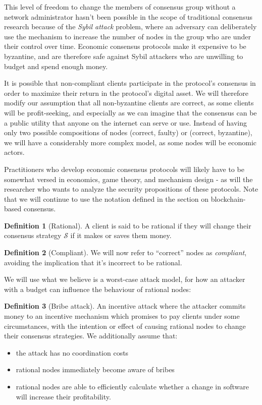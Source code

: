 \documentclass[11pt,a4paper]{article}
\theoremstyle{plain}
\theoremstyle{definition}
\newtheorem{defn}{Definition}
\begin{document}
This level of freedom to change the members of consensus group without a network administrator hasn't been possible in the scope of traditional consensus research because of the \emph{Sybil attack} problem, where an adversary can deliberately use the mechanism to increase the number of nodes in the group who are under their control over time. Economic consensus protocols make it expensive to be byzantine, and are therefore safe against Sybil attackers who are unwilling to budget and spend enough money. 

It is possible that non-compliant clients participate in the protocol's consensus in order to maximize their return in the protocol's digital asset. We will therefore modify our assumption that all non-byzantine clients are correct, as some clients will be profit-seeking, and especially as we can imagine that the consensus can be a public utility that anyone on the internet can serve or use. Instead of having only two possible compositions of nodes (correct, faulty) or (correct, byzantine), we will have a considerably more complex model, as some nodes will be economic actors. 

Practitioners who develop economic consensus protocols will likely have to be somewhat versed in economics, game theory, and mechanism design - as will the researcher who wants to analyze the security propositions of these protocols. Note that we will continue to use the notation defined in the section on blockchain-based consensus.

\begin{defn}[Rational]
A client is said to be rational if they will change their consensus strategy $\mathcal{S}$ if it makes or saves them money.
\end{defn}

\begin{defn}[Compliant]
We will now refer to ``correct'' nodes as \emph{compliant}, avoiding the implication that it's incorrect to be rational.
\end{defn}

We will use what we believe is a worst-case attack model, for how an attacker with a budget can influence the behaviour of rational nodes:

\begin{defn}[Bribe attack]
An incentive attack where the attacker commits money to an incentive mechanism which promises to pay clients under some circumstances, with the intention or effect of causing rational nodes to change their consensus strategies. We additionally assume that: 
\begin{itemize}
\item the attack has no coordination costs
\item rational nodes immediately become aware of bribes
\item rational nodes are able to efficiently calculate whether a change in software will increase their profitability.
\end{itemize}
\end{defn}
\end{document}
